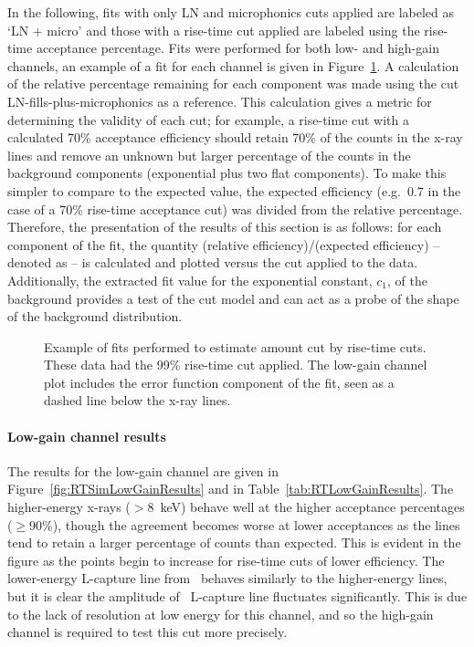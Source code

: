 In the following, fits with only LN and microphonics cuts applied are labeled as `LN + micro' and those with a rise-time cut applied are labeled using the rise-time acceptance percentage.  
Fits were performed for both low- and high-gain channels, an example of a fit for each channel is given in Figure~\ref{fig:BeGeFitExample}.  A calculation of the relative percentage remaining for each component was made using the cut LN-fills-plus-microphonics as a reference.  This calculation gives a metric for determining the validity of each cut; for example, a rise-time cut with a calculated 70\% acceptance efficiency should retain 70\% of the counts in the x-ray lines and remove an unknown but larger percentage of the counts in the background components (exponential plus two flat components).  To make this simpler to compare to the expected value, the expected efficiency (e.g.~0.7 in the case of a 70\% rise-time acceptance cut) was divided from the relative percentage.  Therefore, the presentation of the results of this section is as follows: for each component of the fit, the quantity (relative efficiency)/(expected efficiency) -- denoted as \releff-- is calculated and plotted versus the cut applied to the data.  Additionally, the extracted fit value for the exponential constant, $c_{1}$, of the background provides a test of the cut model and can act as a probe of the shape of the background distribution.  
	
					\begin{figure}
						\centering
						\def\plotwidth{0.75\textwidth}
						
						\caption[Example of fits performed to estimate amount cut by rise-time cuts]
						{Example of fits performed to estimate amount cut by rise-time cuts.  These data had the 99\% rise-time cut applied.  The low-gain channel 
						plot includes the error function component of the fit, seen as a dashed line below the x-ray lines.}
						\label{fig:BeGeFitExample}
					\end{figure}


					\paragraph{Low-gain channel results}

The results for the low-gain channel are given in Figure~\ref{fig:RTSimLowGainResults} and in Table~\ref{tab:RTLowGainResults}.  The higher-energy x-rays ($>8$~keV) behave well at the higher acceptance percentages ($\ge$90\%), though the agreement becomes worse at lower acceptances as the lines tend to retain a larger percentage of counts than expected.  This is evident in the figure as the points begin to increase for rise-time cuts of lower efficiency.  The lower-energy L-capture line from \gersixeight~behaves similarly to the higher-energy lines, but it is clear the amplitude of \znsixfive~L-capture line fluctuates significantly.  This is due to the lack of resolution at low energy for this channel, and so the high-gain channel is required to test this cut more precisely.  

